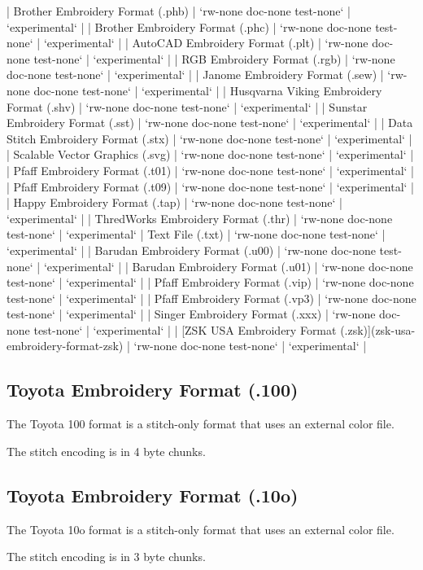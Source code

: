 \documentclass{report}
\begin{document}
| Brother Embroidery Format (.phb) | `rw-none doc-none test-none` | `experimental` |
| Brother Embroidery Format (.phc) | `rw-none doc-none test-none` | `experimental` |
| AutoCAD Embroidery Format (.plt) | `rw-none doc-none test-none` | `experimental` |
| RGB Embroidery Format (.rgb) | `rw-none doc-none test-none` | `experimental` |
| Janome Embroidery Format (.sew) | `rw-none doc-none test-none` | `experimental` |
| Husqvarna Viking Embroidery Format (.shv) | `rw-none doc-none test-none` | `experimental` |
| Sunstar Embroidery Format (.sst) | `rw-none doc-none test-none` | `experimental` |
| Data Stitch Embroidery Format (.stx) | `rw-none doc-none test-none` | `experimental` |
| Scalable Vector Graphics (.svg) | `rw-none doc-none test-none` | `experimental` |
| Pfaff Embroidery Format (.t01) | `rw-none doc-none test-none` | `experimental` |
| Pfaff Embroidery Format (.t09) | `rw-none doc-none test-none` | `experimental` |
| Happy Embroidery Format (.tap) | `rw-none doc-none test-none` | `experimental` |
| ThredWorks Embroidery Format (.thr) | `rw-none doc-none test-none` | `experimental` |
Text File (.txt) | `rw-none doc-none test-none` | `experimental` |
| Barudan Embroidery Format (.u00) | `rw-none doc-none test-none` | `experimental` |
| Barudan Embroidery Format (.u01) | `rw-none doc-none test-none` | `experimental` |
| Pfaff Embroidery Format (.vip) | `rw-none doc-none test-none` | `experimental` |
| Pfaff Embroidery Format (.vp3) | `rw-none doc-none test-none` | `experimental` |
| Singer Embroidery Format (.xxx) | `rw-none doc-none test-none` | `experimental` |
| [ZSK USA Embroidery Format (.zsk)](zsk-usa-embroidery-format-zsk) | `rw-none doc-none test-none` | `experimental` |

\subsection{Toyota Embroidery Format (.100)}

The Toyota 100 format is a stitch-only format that uses an external color file.

The stitch encoding is in 4 byte chunks.

\subsection{Toyota Embroidery Format (.10o)}

The Toyota 10o format is a stitch-only format that uses an external color file.

The stitch encoding is in 3 byte chunks.
\end{document}
